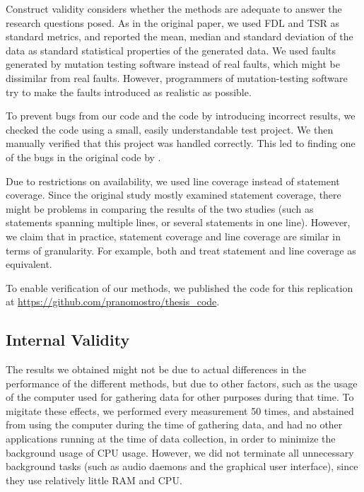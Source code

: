 Construct validity considers whether the methods are adequate to answer
the research questions posed. As in the original paper, we used FDL
and TSR as standard metrics, and reported the mean, median and standard
deviation of the data as standard statistical properties of the generated
data. We used faults generated by mutation testing software instead
of real faults, which might be dissimilar from real faults. However,
programmers of mutation-testing software try to make the faults introduced
as realistic as possible.

To prevent bugs from our code and the code by \cite{cruciani2019scalable}
introducing incorrect results, we checked the code using a small, easily
understandable test project. We then manually verified that this project
was handled correctly. This led to finding one of the bugs in the original
code by \cite{cruciani2019scalable}.

Due to restrictions on availability, we used line coverage instead of
statement coverage. Since the original study mostly examined statement
coverage, there might be problems in comparing the results of the two
studies (such as statements spanning multiple lines, or several statements
in one line). However, we claim that in practice, statement coverage
and line coverage are similar in terms of granularity.  For example,
both \cite{an2018comparing} and \cite{yang2009survey} treat statement
and line coverage as equivalent.

To enable verification of our methods, we published the code for this
replication at \url{https://github.com/pranomostro/thesis_code}.

\subsection{Internal Validity}

The results we obtained might not be due to actual differences in
the performance of the different methods, but due to other factors,
such as the usage of the computer used for gathering data for other
purposes during that time. To migitate these effects, we performed every
measurement 50 times, and abstained from using the computer during the
time of gathering data, and had no other applications running at the time
of data collection, in order to minimize the background usage of CPU
usage. However, we did not terminate all unnecessary background tasks
(such as audio daemons and the graphical user interface), since they
use relatively little RAM and CPU.

